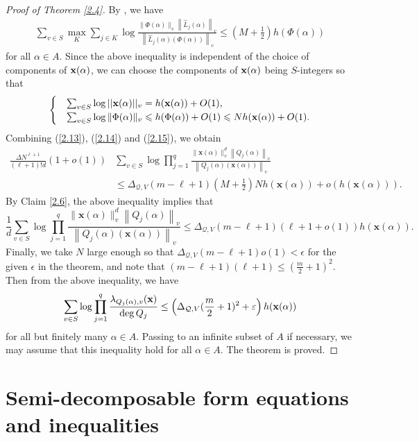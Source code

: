 \documentclass[12pt,leqno]{amsart}
\numberwithin{equation}{section}
\begin{document}
\begin{proof}[Proof of Theorem \ref{2.4}]
By \cite[Theorem B4.1.6]{Ru}, we have
\begin{align}\label{2.14}
\sum_{v \in S} \max _K \sum_{j \in K} \log \frac{\|\Phi(\alpha)\|_v\left\|\widehat{L}_j(\alpha)\right\|_v}{\left\|\widehat{L}_j(\alpha)(\Phi(\alpha))\right\|_v} \leq\left(M+\frac{1}{2}\right) h(\Phi(\alpha))
\end{align}
for all $\alpha \in A$. 
Since the above inequality is independent of the choice of components of ${\bf x}(\alpha)$, we can choose the components of ${\bf x}(\alpha)$ being $S$-integers so that
\begin{align}\label{2.15}
\begin{cases}
& \sum_{v\in S}\log ||{\bf x}(\alpha)||_v=h({\bf x}(\alpha))+O(1), \\
&\sum_{v\in S}\log\Vert \Phi(\alpha)\Vert_v\leqslant h(\Phi(\alpha))+O(1) \leqslant Nh({\bf x}(\alpha))+O(1).
\end{cases}
\end{align}
Combining (\ref{2.13}), (\ref{2.14}) and (\ref{2.15}), we obtain
\begin{align*}
\frac{\Delta N^{\ell+1}}{(\ell+1)!d}(1+o(1))& \sum_{v \in S} \log \prod_{j=1}^q \frac{\|\mathbf{x}(\alpha)\|_v^d\left\|Q_j(\alpha)\right\|_v}{\left\|Q_j(\alpha)(\mathbf{x}(\alpha))\right\|_v}\\
&\leq\Delta_{\mathcal Q,V}(m-\ell+1)\left(M+\frac{1}{2}\right) N h(\mathbf{x}(\alpha))+o(h(\mathbf{x}(\alpha))).
\end{align*}
By Claim \ref{2.6}, the above inequality implies that
$$\frac{1}{d} \sum_{v \in S} \log \prod_{j=1}^q \frac{\|\mathbf{x}(\alpha)\|_v^d\left\|Q_j(\alpha)\right\|_v}{\left\|Q_j(\alpha)(\mathbf{x}(\alpha))\right\|_v} \leqslant \Delta_{\mathcal Q,V}(m-\ell+1)(\ell+1+o(1)) h(\mathbf{x}(\alpha)).$$
Finally, we take $N$ large enough so that $\Delta_{\mathcal Q,V}(m-\ell+1)o(1)<\epsilon$ for the given $\epsilon$ in the theorem, and note that $(m-\ell+1)(\ell+1)\leqslant (\frac{m}{2}+1)^2.$ Then from the above inequality, we have
$$\sum_{v \in S}\log \prod_{j=1}^q \frac{\lambda_{Q_j(\alpha),v}({\bf x})}{\deg Q_j} \leq\left(\Delta_{\mathcal Q,V}(\frac{m}{2}+1)^2+\varepsilon\right) h(\mathbf{x}(\alpha))$$
for all but finitely many $\alpha \in A$. Passing to an infinite subset of $A$ if necessary, we may assume that this inequality hold for all $\alpha\in A$.
The theorem is proved.
\end{proof}

\section{Semi-decomposable form equations and inequalities}
\end{document}
